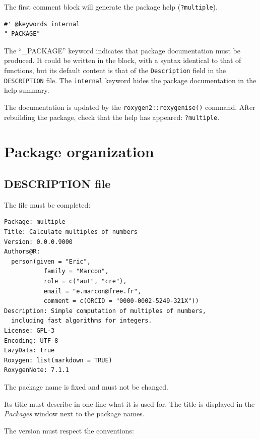 \documentclass[
  12pt,
  american,
  a4paper,
  extrafontsizes,onecolumn,openright
  ]{memoir}
\begin{document}
The first comment block will generate the package help (\texttt{?multiple}).

\begin{verbatim}
#' @keywords internal 
"_PACKAGE"
\end{verbatim}

The ``\_PACKAGE'' keyword indicates that package documentation must be produced.
It could be written in the block, with a syntax identical to that of functions, but its default content is that of the \texttt{Description} field in the \texttt{DESCRIPTION} file.
The \texttt{internal} keyword hides the package documentation in the help summary.

The documentation is updated by the \texttt{roxygen2::roxygenise()} command.
After rebuilding the package, check that the help has appeared: \texttt{?multiple}.

\hypertarget{package-organization}{%
\section{Package organization}\label{package-organization}}

\hypertarget{sec:package-description}{%
\subsection{DESCRIPTION file}\label{sec:package-description}}

The file must be completed:

\begin{verbatim}
Package: multiple
Title: Calculate multiples of numbers
Version: 0.0.0.9000
Authors@R: 
  person(given = "Eric",
           family = "Marcon",
           role = c("aut", "cre"),
           email = "e.marcon@free.fr",
           comment = c(ORCID = "0000-0002-5249-321X"))
Description: Simple computation of multiples of numbers, 
  including fast algorithms for integers.
License: GPL-3
Encoding: UTF-8
LazyData: true
Roxygen: list(markdown = TRUE)
RoxygenNote: 7.1.1
\end{verbatim}

The package name is fixed and must not be changed.

Its title must describe in one line what it is used for.
The title is displayed in the \emph{Packages} window next to the package names.

The version must respect the conventions:
\end{document}
